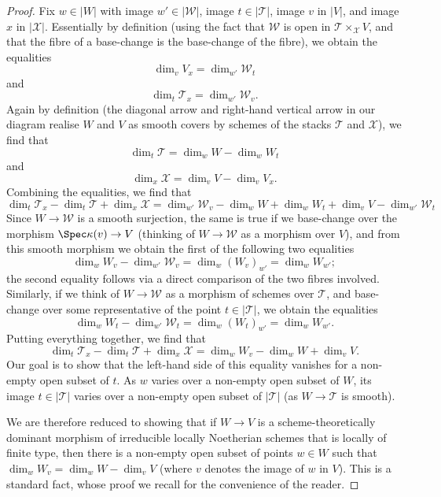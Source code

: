 \begin{proof}
\medskip\noindent
Fix $w \in |W|$ with image $w' \in |\mathcal{W}|$,
image $t \in |\mathcal{T}|$, image $v$ in $|V|$,
and image $x$ in $|\mathcal{X}|$.
Essentially by definition (using the
fact that $\mathcal{W}$ is open in $\mathcal{T}\times_{\mathcal{X}} V$, and that
the fibre of a base-change is the base-change of the fibre),
we obtain the equalities
$$
\dim_v V_x = \dim_{w'} \mathcal{W}_t
$$
and
$$
\dim_t \mathcal{T}_x = \dim_{w'} \mathcal{W}_v.
$$
Again by definition (the diagonal arrow and right-hand vertical
arrow in our diagram realise $W$ and $V$ as smooth covers by
schemes of the stacks $\mathcal{T}$ and $\mathcal{X}$), we find that
$$
\dim_t \mathcal{T} = \dim_w W - \dim_w W_t
$$
and
$$
\dim_x \mathcal{X} = \dim_v V - \dim_v V_x.
$$
Combining the equalities, we find that
$$
\dim_t \mathcal{T}_x - \dim_t \mathcal{T} + \dim_x \mathcal{X}
= \dim_{w'} \mathcal{W}_v - \dim_w W + \dim_w W_t + \dim_v V -
\dim_{w'} \mathcal{W}_t
$$
Since $W \to \mathcal{W}$ is a smooth surjection, the same is true
if we base-change over the morphism $\Spec \kappa(v) \to V$
(thinking of $W \to \mathcal{W}$ as a morphism over $V$),
and from this smooth morphism we obtain the first of the following
two equalities
$$
\dim_w W_v - \dim_{w'} \mathcal{W}_v = \dim_w (W_v)_{w'} = \dim_w W_{w'};
$$
the second equality follows via a direct comparison of the
two fibres involved.
Similarly, if we think of $W \to \mathcal{W}$ as a morphism of schemes
over $\mathcal{T}$, and base-change over some representative of the point
$t \in |\mathcal{T}|$, we obtain the equalities
$$
\dim_w W_t - \dim_{w'} \mathcal{W}_t = \dim_w (W_t)_{w'} = \dim_w W_{w'}.
$$
Putting everything together, we find that
$$
\dim_t \mathcal{T}_x - \dim_t \mathcal{T} + \dim_x \mathcal{X}
=  \dim_w W_v - \dim_w W + \dim_v V.
$$
Our goal is to show that the left-hand side of this equality
vanishes for a non-empty open subset
of $t$.  As $w$ varies over a non-empty open subset of $W$,
its image $t \in |\mathcal{T}|$ varies over a non-empty open
subset of $|\mathcal{T}|$ (as $W \to \mathcal{T}$ is smooth).

\medskip\noindent
We are therefore reduced to showing that if $W\to V$ is a
scheme-theoretically dominant morphism of irreducible locally
Noetherian schemes that is locally of finite type,
then there is a non-empty open subset of
points $w\in W$ such that $\dim_w W_v =\dim_w W - \dim_v V$
(where $v$ denotes the image of $w$ in $V$).
This is a standard fact,
whose proof we recall for the convenience of the reader.


\end{proof}
